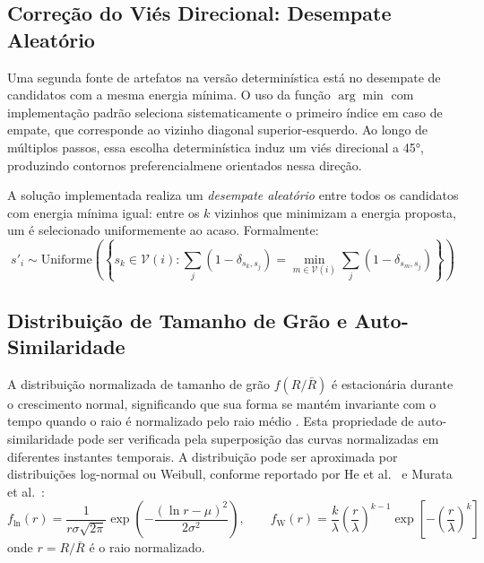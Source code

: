 \documentclass[12pt,a4paper]{article}
\begin{document}
\subsection{Correção do Viés Direcional: Desempate Aleatório}

Uma segunda fonte de artefatos na versão determinística está no desempate de
candidatos com a mesma energia mínima. O uso da função $\arg\min$ com implementação
padrão seleciona sistematicamente o primeiro índice em
caso de empate, que corresponde ao vizinho diagonal superior-esquerdo. Ao longo de
múltiplos passos, essa escolha determinística induz um viés direcional a 45°,
produzindo contornos preferencialmene orientados nessa direção.

A solução implementada realiza um \emph{desempate aleatório} entre todos os candidatos
com energia mínima igual: entre os $k$ vizinhos que minimizam a energia proposta,
um é selecionado uniformemente ao acaso. Formalmente:
\begin{equation}
    s'_i \sim \text{Uniforme}\!\left(\left\{
        s_k \in \mathcal{V}(i) : \sum_{j} (1-\delta_{s_k, s_j}) = \min_{m \in \mathcal{V}(i)}
        \sum_{j}(1-\delta_{s_m, s_j})
    \right\}\right)
    \label{eq:desempate}
\end{equation}

\subsection{Distribuição de Tamanho de Grão e Auto-Similaridade}

A distribuição normalizada de tamanho de grão $f(R/\bar{R})$ é estacionária durante
o crescimento normal, significando que sua forma se mantém invariante com o tempo
quando o raio é normalizado pelo raio médio \cite{humphreys2004}. Esta propriedade
de auto-similaridade pode ser verificada pela superposição das curvas normalizadas
em diferentes instantes temporais. A distribuição pode ser aproximada por distribuições
log-normal ou Weibull, conforme reportado por He et al.\ \cite{he2006} e Murata et
al.\ \cite{murata2024}:
\begin{equation}
    f_{\text{ln}}(r) = \frac{1}{r\sigma\sqrt{2\pi}} \exp\!\left(-\frac{(\ln r - \mu)^2}{2\sigma^2}\right),
    \qquad
    f_{\text{W}}(r) = \frac{k}{\lambda}\left(\frac{r}{\lambda}\right)^{k-1}
    \exp\!\left[-\left(\frac{r}{\lambda}\right)^k\right]
\end{equation}
onde $r = R/\bar{R}$ é o raio normalizado.

\newpage
\end{document}
